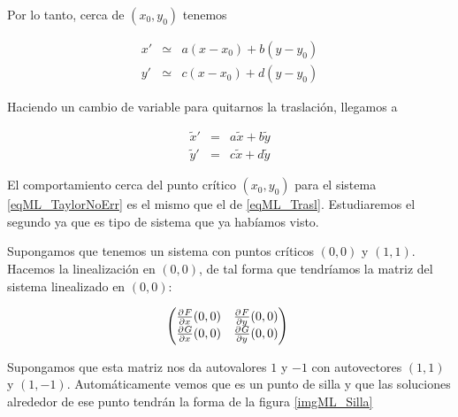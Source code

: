 Por lo tanto, cerca de $(x_0, y_0)$ tenemos 

\begin{equation} \label{eqML_TaylorNoErr}
\begin{matrix}
x' &\simeq&  a(x-x_0) + b(y-y_0) \\
y' &\simeq& c(x-x_0) + d(y-y_0) 
\end{matrix}
\end{equation}

Haciendo un cambio de variable para quitarnos la traslación, llegamos a 

\begin{equation} \label{eqML_Trasl}
\begin{matrix}
\tilde{x}' &=& a\tilde{x} + b \tilde{y} \\
\tilde{y}' &=& c\tilde{x} + d \tilde{y} 
\end{matrix}
\end{equation}


El comportamiento cerca del punto crítico $(x_0, y_0)$ para el sistema \eqref{eqML_TaylorNoErr} es el mismo que el de \eqref{eqML_Trasl}. Estudiaremos el segundo ya que es tipo de sistema que ya habíamos visto.

Supongamos que tenemos un sistema con puntos críticos $(0,0)$ y $(1,1)$. Hacemos la linealización en $(0,0)$, de tal forma que tendríamos la matriz del sistema linealizado en $(0,0)$:

\begin{equation} \label{eqML_MatSistLin} \begin{pmatrix}
\pd{F}{x}(0,0) & \pd{F}{y}(0,0) \\
\pd{G}{x}(0,0) & \pd{G}{y}(0,0)
\end{pmatrix} \end{equation}

Supongamos que esta matriz nos da autovalores $1$ y $-1$ con autovectores $(1,1)$ y $(1,-1)$. Automáticamente vemos que es un punto de silla y que las soluciones alrededor de ese punto tendrán la forma de la figura \ref{imgML_Silla}

